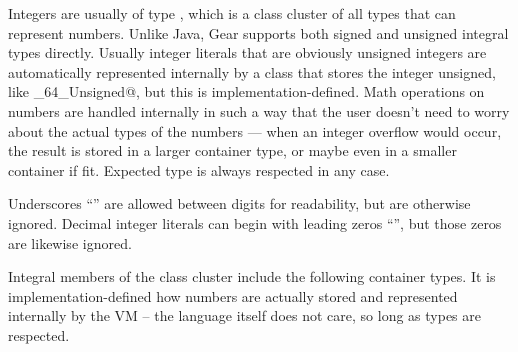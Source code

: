 Integers are usually of type \lstinline@Number@, which is a class cluster of all types that can represent numbers. Unlike Java, Gear supports both signed and unsigned integral types directly. Usually integer literals that are obviously unsigned integers are automatically represented internally by a class that stores the integer unsigned, like \lstinline@Integer_64_Unsigned@, but this is implementation-defined. Math operations on numbers are handled internally in such a way that the user doesn't need to worry about the actual types of the numbers — when an integer overflow would occur, the result is stored in a larger container type, or maybe even in a smaller container if fit. Expected type is always respected in any case. 

Underscores ``\code{_}'' are allowed between digits for readability, but are otherwise ignored. Decimal integer literals can begin with leading zeros ``'', but those zeros are likewise ignored. 

Integral members of the \lstinline@Number@ class cluster include the following container types. It is implementation-defined how numbers are actually stored and represented internally by the VM -- the language itself does not care, so long as types are respected. 

